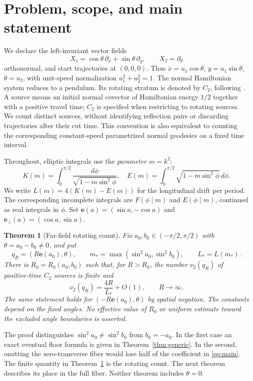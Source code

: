 \documentclass[11pt,a4paper]{article}
\newtheorem{theorem}{Theorem}[section]
\theoremstyle{remark}\newtheorem{remark}[theorem]{Remark}
\newcommand{\ee}{\mathbf e}
\newcommand{\ep}{\mathbf e_{\perp}}
\begin{document}
\section{Problem, scope, and main statement}

We declare the left-invariant vector fields
\[
 X_1=\cos\theta\,\partial_x+\sin\theta\,\partial_y,
 \qquad X_2=\partial_\theta
\]
orthonormal, and start trajectories at $(0,0,0)$. Thus
$\dot x=u_1\cos\theta$, $\dot y=u_1\sin\theta$, $\dot\theta=u_2$,
with unit-speed normalization $u_1^2+u_2^2=1$.
The normal Hamiltonian system reduces to a pendulum. Its rotating stratum
is denoted by $C_2$, following \cite{MS,SC}. A source means an initial
normal covector of Hamiltonian energy $1/2$ together with a positive
travel time; $C_2$ is specified when restricting to rotating sources.
We count distinct sources, without identifying reflection pairs or
discarding trajectories after their cut time. This convention is also
equivalent to counting the corresponding constant-speed parametrized
normal geodesics on a fixed time interval.

Throughout, elliptic integrals use the \emph{parameter} $m=k^2$:
\[
 K(m)=\int_0^{\pi/2}\frac{d\phi}{\sqrt{1-m\sin^2\phi}},\quad
 E(m)=\int_0^{\pi/2}\sqrt{1-m\sin^2\phi}\,d\phi.
\]
We write $L(m)=4(K(m)-E(m))$ for the longitudinal drift per period.
The corresponding incomplete integrals are $F(\phi\mid m)$ and
$E(\phi\mid m)$, continued as real integrals in $\phi$.
Set $\ee(a)=(\sin a,-\cos a)$ and $\ep(a)=(\cos a,\sin a)$.

\begin{theorem}[Far-field rotating count]\label{thm:main}
Fix $a_0,b_0\in(-\pi/2,\pi/2)$ with $\theta=a_0-b_0\ne0$, and put
\[
 q_R=(R\ee(a_0),\theta),\qquad
 m_*=\max(\sin^2a_0,\sin^2b_0),\qquad L_*=L(m_*).
\]
There is $R_0=R_0(a_0,b_0)$ such that, for $R>R_0$, the number
$\nu_2(q_R)$ of positive-time $C_2$ sources is finite and
\begin{equation}\label{eq:main}
 \nu_2(q_R)=\frac{4R}{L_*}+O(1),\qquad R\longrightarrow\infty.
\end{equation}
The same statement holds for $(-R\ee(a_0),\theta)$ by spatial negation.
The constants depend on the fixed angles. No effective value of $R_0$
or uniform estimate toward the excluded angle boundaries is asserted.
\end{theorem}

The proof distinguishes $\sin^2a_0\ne\sin^2b_0$ from $b_0=-a_0$.
In the first case an exact eventual floor formula is given in
Theorem~\ref{thm:generic}. In the second, omitting the zero-transverse
fiber would lose half of the coefficient in \eqref{eq:main}.
The finite quantity in Theorem~\ref{thm:main} is the rotating count.
The next theorem describes its place in the full fiber. Neither theorem
includes $\theta=0$.
\end{document}
